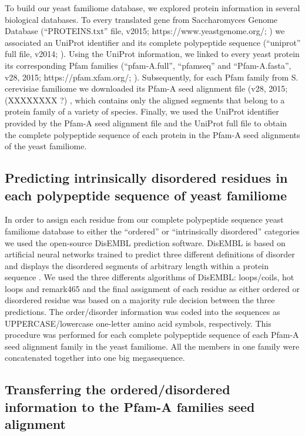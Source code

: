 \documentclass[preprint,12pt]{elsarticle}
\begin{document}
To build our yeast familiome database, we explored protein information in several biological databases. To every translated gene from Saccharomyces Genome Database (“PROTEINS.txt” file, v2015; https://www.yeastgenome.org/; \cite{cherry2012saccharomyces}) we associated an UniProt identifier and its complete polypeptide sequence (“uniprot” full file, v2014; \cite{gene2015gene}). Using the UniProt information, we linked to every yeast protein its corresponding  Pfam families (“pfam-A.full”, “pfamseq” and “Pfam-A.fasta”, v28, 2015; https://pfam.xfam.org/;  \cite{bateman1999pfam}  \cite{punta2011pfam}). Subsequently, for each Pfam family from S. cerevisiae familiome we downloaded its Pfam-A seed alignment file (v28, 2015; \cite{sonnhammer1997pfam} \cite{punta2011pfam} (XXXXXXXX ?) , which contains only the aligned segments that belong to a protein family of a variety of species. Finally, we used the UniProt identifier provided by the Pfam-A seed alignment file and the UniProt full file to obtain the complete polypeptide sequence of each protein in the Pfam-A seed alignments of the yeast familiome. 


\subsection{Predicting intrinsically disordered residues in each polypeptide sequence of yeast familiome}

In order to assign each residue from our complete polypeptide sequence yeast familiome database to either the “ordered” or “intrinsically disordered” categories we used the open-source DisEMBL prediction software. DisEMBL is  based on artificial neural networks trained to predict three different definitions of disorder and displays  the disordered segments of arbitrary length within a protein sequence \cite{linding2003protein}. We used the three differents algorithms of DisEMBL: loops/coils, hot loops and remark465 and the final assignment of each residue as either ordered  or  disordered residue  was based on a majority rule decision between the three predictions. The order/disorder information was coded into the sequences as UPPERCASE/lowercase one-letter amino acid symbols, respectively. This procedure was performed for each complete polypeptide sequence of each Pfam-A seed alignment family in the yeast familiome. All the members in one family were concatenated together into one big megasequence.
 

\subsection{Transferring the ordered/disordered information to the Pfam-A families seed alignment}
\end{document}
